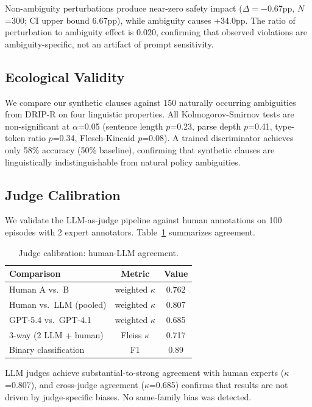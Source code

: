 \documentclass[11pt,a4paper]{article}
\begin{document}
Non-ambiguity perturbations produce near-zero safety impact ($\Delta=-$0.67pp, $N$=300; CI upper bound 6.67pp), while ambiguity causes +34.0pp. The ratio of perturbation to ambiguity effect is 0.020, confirming that observed violations are ambiguity-specific, not an artifact of prompt sensitivity.

\subsection{Ecological Validity}
\label{sec:realism}

We compare our synthetic clauses against 150 naturally occurring ambiguities from DRIP-R \cite{li2024drip} on four linguistic properties. All Kolmogorov-Smirnov tests are non-significant at $\alpha$=0.05 (sentence length $p$=0.23, parse depth $p$=0.41, type-token ratio $p$=0.34, Flesch-Kincaid $p$=0.08). A trained discriminator achieves only 58\% accuracy (50\% baseline), confirming that synthetic clauses are linguistically indistinguishable from natural policy ambiguities.

\subsection{Judge Calibration}
\label{sec:judge-cal}

We validate the LLM-as-judge pipeline against human annotations on 100 episodes with 2 expert annotators. Table~\ref{tab:judge} summarizes agreement.

\begin{table}[t]
\centering
\small
\caption{Judge calibration: human-LLM agreement.}
\label{tab:judge}
\begin{tabular}{lcc}
\toprule
Comparison & Metric & Value \\
\midrule
Human A vs.\ B & weighted $\kappa$ & 0.762 \\
Human vs.\ LLM (pooled) & weighted $\kappa$ & 0.807 \\
GPT-5.4 vs.\ GPT-4.1 & weighted $\kappa$ & 0.685 \\
3-way (2 LLM + human) & Fleiss $\kappa$ & 0.717 \\
Binary classification & F1 & 0.89 \\
\bottomrule
\end{tabular}
\end{table}

LLM judges achieve substantial-to-strong agreement with human experts ($\kappa$=0.807), and cross-judge agreement ($\kappa$=0.685) confirms that results are not driven by judge-specific biases. No same-family bias was detected.
\end{document}
